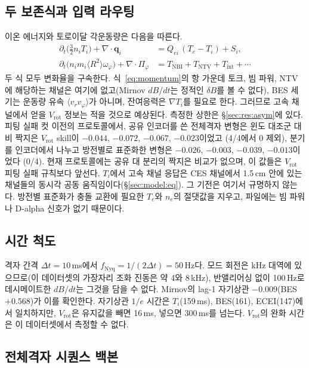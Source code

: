 \documentclass[10pt,twocolumn,letterpaper]{article}
\newcommand{\Ti}{\ensuremath{T_i}}
\newcommand{\Vrot}{\ensuremath{V_\mathrm{rot}}}
\begin{document}
\subsection{두 보존식과 입력 라우팅}
\label{sec:model:physics}
이온 에너지와 토로이달 각운동량은 다음을 따른다.
\begin{align}
  \partial_t\bigl(\tfrac{3}{2}n_i T_i\bigr) + \nabla\!\cdot\!\mathbf{q}_i
    &= Q_{ei}\,(T_e-T_i) + S_i,
  \label{eq:energy}\\
  \partial_t\bigl(n_i m_i \langle R^2\rangle \omega_\varphi\bigr)
    + \nabla\!\cdot\!\Pi_\varphi
    &= T_\mathrm{NBI} + T_\mathrm{NTV} + T_\mathrm{int} + \cdots
  \label{eq:momentum}
\end{align}
두 식 모두 변화율을 구속한다. 식~\eqref{eq:momentum}의 항 가운데 토크, 빔 파워, NTV에
해당하는 채널은 여기에 없고(Mirnov $dB/dt$는 정적인 $\delta B$를 볼 수 없다), BES 세기는
운동량 유속 $\langle v_r v_\varphi\rangle$가 아니며, 잔여응력은 $\nabla T_i$를 필요로 한다.
그러므로 고속 채널에서 얻을 \Vrot{} 정보는 적을 것으로 예상된다. 측정한 상한은
\S\ref{sec:res:asym}에 있다. 피팅 실패 컷 이전의 프로토콜에서, 공유 인코더를 쓴 전체격자
변형은 윈도 대조군 대비 짝지은 \Vrot{} skill이 $-0.044$, $-0.072$, $-0.067$, $-0.023$이었고
(4/4에서 0 제외), 분기를 인코더에서 나누고 방전별로 표준화한 변형은 $-0.026$, $-0.003$, $-0.039$, $-0.013$이었다
(0/4). 현재 프로토콜에는 공유 대 분리의 짝지은 비교가 없으며, 이 값들은 \Vrot{} 피팅 실패
규칙보다 앞선다. \Ti{}에서 고속 채널 응답은 CES 채널에서 1.5\,cm 안에 있는 채널들의 동시각
공동 움직임이다(\S\ref{sec:model:eq}). 그 기전은 여기서 규명하지 않는다. 방전별 표준화가
충돌 교환에 필요한 $T_e$와 $n_e$의 절댓값을 지우고, 파일에는 빔 파워나 D-alpha 신호가 없기
때문이다.

\subsection{시간 척도}
\label{sec:model:scales}
격자 간격 $\Delta t=10$\,ms에서 $f_\mathrm{Nyq}=1/(2\Delta t)=50$\,Hz다. 모드 회전은 kHz
대역에 있으므로(이 데이터셋의 가장자리 조화 진동은 약 4와 8\,kHz), 반앨리어싱 없이
100\,Hz로 데시메이트한 $dB/dt$는 그것을 담을 수 없다. Mirnov의 lag-1 자기상관
$-0.009$(BES $+0.568$)가 이를 확인한다. 자기상관 $1/e$ 시간은 \Ti{}(159\,ms), BES(161),
ECEI(147)에서 일치하지만, \Vrot{}은 유지값을 빼면 16\,ms, 넣으면 300\,ms를 넘는다.
\Vrot{}의 완화 시간은 이 데이터셋에서 측정할 수 없다.

\subsection{전체격자 시퀀스 백본}
\label{sec:model:backbone}
\end{document}
